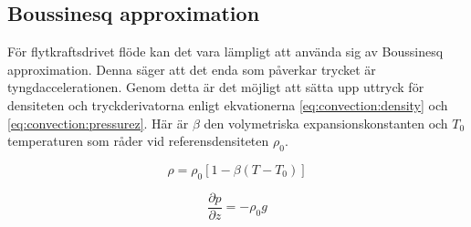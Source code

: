 
\subsection{Boussinesq approximation}

För flytkraftsdrivet flöde kan det vara lämpligt att använda sig av
Boussinesq approximation. Denna säger att det enda som påverkar trycket är
tyngdaccelerationen. Genom detta är det möjligt att sätta upp uttryck för densiteten
och tryckderivatorna enligt ekvationerna \eqref{eq:convection:density}
och \eqref{eq:convection:pressurez}. Här är
$\beta$ den volymetriska expansionskonstanten och
$T_0$ temperaturen som råder vid referensdensiteten $\rho_0$.

\begin{equation}
\label{eq:convection:density}
\rho = \rho_0[1-\beta(T-T_0)]
\end{equation}

\begin{equation}
\label{eq:convection:pressurez}
\frac{\partial p}{\partial z} = -\rho_0g
\end{equation}


